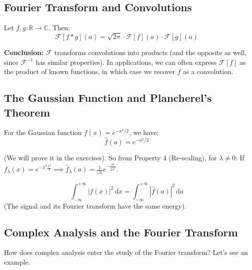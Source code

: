 \subsection{Fourier Transform and Convolutions}

\begin{theorem}
Let $f, g: \mathbb{R} \to \mathbb{C}$. Then:
\begin{equation*}
    \mathcal{F}[f * g](a) = \sqrt{2\pi} \cdot \mathcal{F}[f](a) \cdot \mathcal{F}[g](a)
\end{equation*}
\end{theorem}
\textbf{Conclusion:} $\mathcal{F}$ transforms convolutions into products (and the opposite as well, since $\mathcal{F}^{-1}$ has similar properties). In applications, we can often express $\mathcal{F}[f]$ as the product of known functions, in which case we recover $f$ as a convolution.

\subsection{The Gaussian Function and Plancherel's Theorem}

\begin{theorem}
For the Gaussian function $f(x) = e^{-x^2/2}$, we have:
\begin{equation*}
    \hat{f}(a) = e^{-a^2/2}
\end{equation*}
\end{theorem}

(We will prove it in the exercises). So from Property 4 (Re-scaling), for $\lambda \neq 0$:
If $f_\lambda(x) = e^{-\lambda^2 \frac{x^2}{2}} \implies \hat{f}_\lambda(a) = \frac{1}{|\lambda|} e^{-\frac{a^2}{2\lambda^2}}$.

\begin{theorem}
\begin{equation*}
    \int_{-\infty}^{+\infty} |f(x)|^2 \,\mathrm{d}x = \int_{-\infty}^{+\infty} |\hat{f}(a)|^2 \,\mathrm{d}a
\end{equation*}
(The signal and its Fourier transform have the same energy).
\end{theorem}


\subsection{Complex Analysis and the Fourier Transform}

How does complex analysis enter the study of the Fourier transform? Let's see an example.

